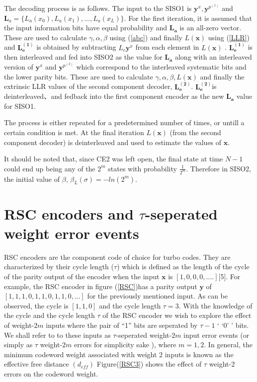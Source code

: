\documentclass[a4paper, 12pt, oneside, openary]{jbook}
\begin{document}
  The decoding process is as follows.
The input to the SISO1 is $\mathbf{y}^x,\mathbf{y}^{p^{(1)}}$ 
and $\mathbf{L}_a=\{L_a(x_0),L_a(x_1),...,L_a(x_{L})\}$. 
For the first iteration, it is assumed 
that the input information bits have equal probability and $\mathbf{L_a}$ is an 
all-zero vector.
These are used to calculate $\gamma ,\alpha , \beta$ using (\ref{abc})
 and finally
$ L(\mathbf{x})$ using (\ref{LLR}) and $\mathbf{L_e^{(1)}}$ is obtained by subtracting
 $L_c\mathbf{y}^x$  from each element in $ L(\mathbf{x})$ .
$\mathbf{L_e^{(1)}}$ is then
 interleaved and fed into SISO2 as the value for
 $\mathbf{L_a}$ along with an interleaved version of $\mathbf{y}^{x}$ and 
 $ \mathbf{y}^{p^{(2)}}$ which correspond to
 the interleaved systematic bits and the lower parity bits. These are used to calculate 
 $\gamma,\alpha , 
\beta, L(\mathbf{x})$
 and finally the extrinsic LLR values 
of the second component decoder, $\mathbf{L_e^{(2)}}$.
$\mathbf{L_e^{(2)}}$is deinterleaved、and fedback into the first component encoder
 as the new $\mathbf{L_a}$ value for SISO1.

The process is either repeated for a predetermined number of times, or untill a certain 
condition is met. At the final iteration $ L(\mathbf{x})$ (from the second component
 decoder) is deinterleaved and used to estimate the values of $\mathbf{x}$.
 
  It should be noted that, since CE2 was left open, 
 the final state at time $N-1$ could end up being any of the $2^m$ states with 
 probability $\frac{1}{2^m}$. Therefore in SISO2, the initial
 value of $\beta$, $\beta_L(\sigma)=-ln(2^m)$.
 
 \section{RSC encoders and $\tau$-seperated weight error events}
RSC encoders are the component code of choice for turbo codes. They are
characterized by their cycle length ($\tau$) which is defined as the length of the cycle
 of the parity output of the encoder when the input $\mathbf{x}$ is $[1,0,0,0,....]$[5]. 
For example, the RSC encoder in figure (\ref{RSC})has a parity output $\mathbf{y}$ of 
$[1,1,1,0,1,1,0,1,1,0,...]$
for the previously mentioned input. As can be observed, the cycle is $[1,1,0]$ and
the cycle length $\tau=3$. With the knowledge of the cycle and the cycle length $\tau$
of the RSC encoder we wish to explore the effect of weight-$2m$ inputs where the pair of
``1'' bits
 are seperated by $\tau-1$ ` `0' ' bits. We shall refer to to these inputs as
 $\tau$-seperated weight-$2m$ input error events (or simply as $\tau$ weight-$2m$ errors for
 simplicity sake ), where $m={1,2}$. 
In general, the minimum codeword weight associated with weight 2 inputs is known as the effective free distance $(d_{eff})$\cite{ref5}
 Figure(\ref{RSC3})  shows the effect of $\tau$ weight-2 errors on the codeword weight.
 
\end{document}
